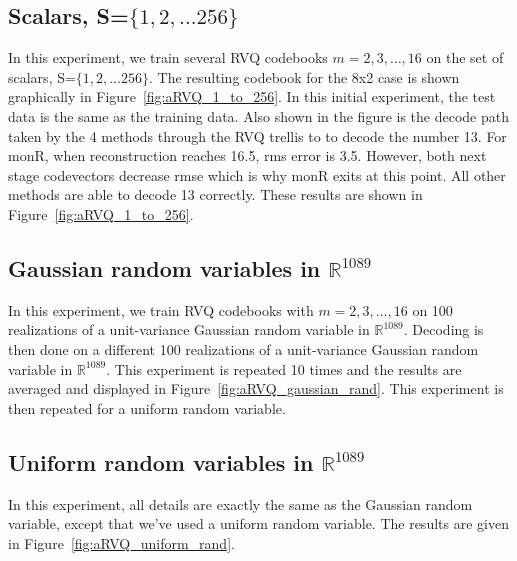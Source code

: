 \subsection{Scalars, S=$\{1, 2, \ldots 256\}$}
In this experiment, we train several RVQ codebooks $m=2, 3, \ldots, 16$ on the set of scalars, S=$\{1, 2, \ldots 256\}$.  The resulting codebook for the 8x2 case is shown graphically in Figure~\ref{fig:aRVQ_1_to_256}.  In this initial experiment, the test data is the same as the training data.  Also shown in the figure is the decode path taken by the 4 methods through the RVQ trellis to to decode the number 13.  For monR, when reconstruction reaches 16.5, rms error is 3.5.  However, both next stage codevectors decrease rmse which is why monR exits at this point.  All other methods are able to decode 13 correctly.   These results are shown in Figure~\ref{fig:aRVQ_1_to_256}. 

\subsection{Gaussian random variables in $\mathbb{R}^{1089}$}
In this experiment, we train RVQ codebooks with $m=2, 3, \ldots, 16$ on 100 realizations of a unit-variance Gaussian random variable in $\mathbb{R}^{1089}$.  Decoding is then done on a different 100 realizations of a unit-variance Gaussian random variable in $\mathbb{R}^{1089}$.  This experiment is repeated 10 times and the results are averaged and displayed in Figure~\ref{fig:aRVQ_gaussian_rand}.  This experiment is then repeated for a uniform random variable. 

\subsection{Uniform random variables in $\mathbb{R}^{1089}$}
In this experiment, all details are exactly the same as the Gaussian random variable, except that we've used a uniform random variable.  The results are given in Figure~\ref{fig:aRVQ_uniform_rand}.





